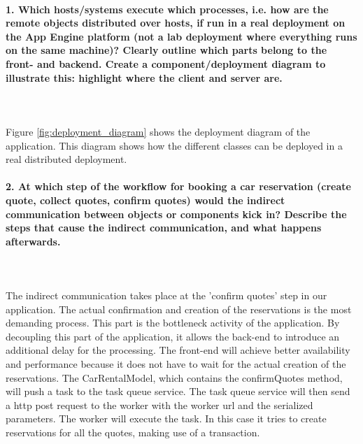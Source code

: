 \documentclass{ds-report}
\begin{document}
	\maketitle

	\paragraph{1. Which hosts/systems execute which processes, i.e. how are the remote objects distributed over hosts, if run in a real deployment on the App Engine platform (not a lab deployment where everything runs on the same machine)? Clearly outline which parts belong to the front- and backend. Create a component/deployment diagram to illustrate this: highlight where the client and server are.} \mbox{}\\\\
Figure \ref{fig:deployment_diagram} shows the deployment diagram of the application. This diagram shows how the different classes can be deployed in a real distributed deployment.



	
	\paragraph{2. At which step of the workflow for booking a car reservation (create quote, collect quotes, confirm quotes) would the indirect communication between objects or components kick in? Describe the steps that cause the indirect communication, and what happens afterwards.} \mbox{}\\\\
The indirect communication takes place at the 'confirm quotes' step in our application. The actual confirmation and creation of the reservations is the most demanding process. This part is the bottleneck activity of the application. By decoupling this part of the application, it allows the  back-end to introduce an additional delay for the processing. The front-end will achieve better availability and performance because it does not have to wait for the actual creation of the reservations. The CarRentalModel, which contains the confirmQuotes method, will push a task to the task queue service. The task queue service will then send a http post request to the worker with the worker url and the serialized parameters. The worker will execute the task. In this case it tries to create reservations for all the quotes, making use of a transaction.
\end{document}
